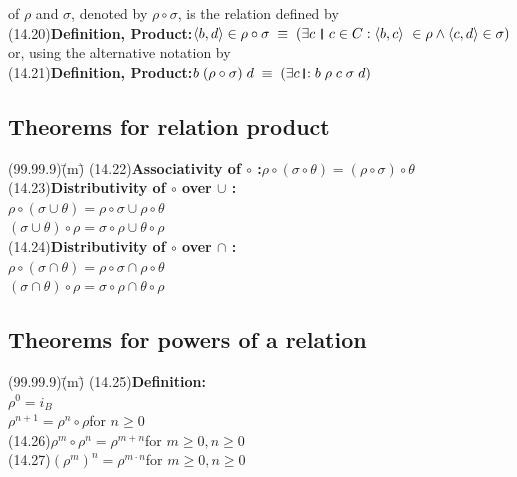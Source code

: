 \documentclass{amsart}
\newcommand{\lgap}{2pt}                             %
\newcommand{\equivs}{\ensuremath{\;\equiv\;}}       %
\newcommand{\thedr}{\rule[-.25ex]{.32mm}{1.75ex}}   %
\newcommand{\dr}{\;\,\thedr\,\;}                    %
\newcommand{\rb}{:}                                 %
\newcommand{\drrb}{\;\thedr\,{:}\;}                 %
\newcommand{\ext}{\exists}                          %
\begin{document}
\begin{tabbing}
of $\rho$ and $\sigma$, denoted by $\rho\circ \sigma$, is the relation defined by\\[\lgap]
(14.20)\>\textbf{Definition, Product:}\quad $\langle b,d\rangle \in \rho\circ\sigma \equivs (\ext c\dr c\in C\rb \langle b,c\rangle\ \in \rho \land \langle c,d\rangle \in \sigma)$\\[\lgap]
or, using the alternative notation by\\[\lgap]
(14.21)\>\textbf{Definition, Product:}\quad $b\; (\rho\circ \sigma)\;d \equivs (\ext c\drrb b\;\rho\;c\;\sigma\;d)$\\[\lgap]
\end{tabbing}

\subsection*{Theorems for relation product}
\begin{tabbing}
(99.99.9)\;\=(m)\;\=\kill
(14.22)\>\textbf{Associativity of $\circ$ :}\quad $\rho\circ (\sigma\circ \theta) = (\rho\circ \sigma)\circ \theta$\\[\lgap]
(14.23)\>\textbf{Distributivity of $\circ$ over $\cup$ :}\\[\lgap]
       \>$\rho\circ (\sigma\cup\theta) = \rho\circ\sigma \cup \rho\circ\theta$\\[\lgap]
       \>$(\sigma\cup\theta) \circ\rho = \sigma\circ\rho \cup \theta\circ\rho$\\[\lgap]
(14.24)\>\textbf{Distributivity of $\circ$ over $\cap$ :}\\[\lgap]
       \>$\rho\circ (\sigma\cap\theta) = \rho\circ\sigma \cap \rho\circ\theta$\\[\lgap]
       \>$(\sigma\cap\theta) \circ\rho = \sigma\circ\rho \cap \theta\circ\rho$\\[\lgap]
\end{tabbing}


\subsection*{Theorems for powers of a relation}
\begin{tabbing}
(99.99.9)\;\=(m)\;\=\kill
(14.25)\>\textbf{Definition:}\\[\lgap]
       \>$\rho^{0} = i_{B}$\\[\lgap]
       \>$\rho^{n+1} = \rho^{n}\circ \rho$\quad for $n\ge 0$\\[\lgap]
(14.26)\>$\rho^{m}\circ\rho^{n} = \rho^{m+n}$\quad for $m\ge 0, n\ge 0$\\[\lgap]
(14.27)\>$(\rho^{m})^{n} = \rho^{m\cdot n}$\quad for $m\ge 0, n\ge 0$\\[\lgap]
\end{tabbing}
\end{document}
